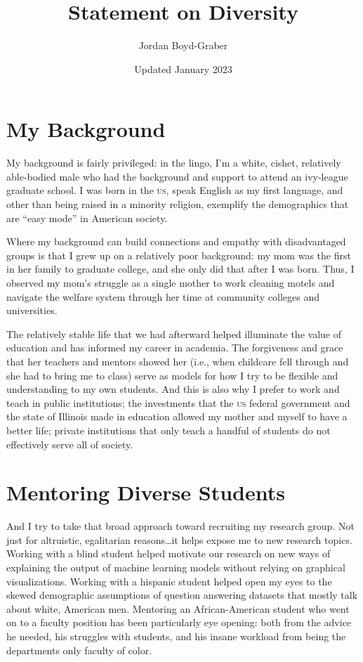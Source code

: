 \documentclass[11pt]{amsart}
\newcommand{\abr}[1]{\textsc{#1}}
\begin{document}
 \title{Statement on Diversity}

 \author{Jordan Boyd-Graber}
\address{University of Maryland}

\date{Updated January 2023}


\keywords{}

\maketitle

\section{My Background}

My background is fairly privileged: in the lingo, I'm a white, cishet,
relatively able-bodied male who had the background and support to attend an ivy-league graduate school.
%
I was born in the \abr{us}, speak English as my first language, and
other than being raised in a minority religion, exemplify the
demographics that are ``easy mode'' in American society.

Where my background can build connections and empathy with
disadvantaged groups is that I grew up on a relatively poor
background: my mom was the first in her family to graduate college,
and she only did that after I was born.
%
Thus, I observed my mom's struggle as a single mother to work cleaning
motels and navigate the welfare system through her time at community colleges and universities.

The relatively stable life that we had afterward helped illuminate the
value of education and has informed my career in academia.
%
The forgiveness and grace that her teachers and mentors showed her
(i.e., when childcare fell through and she had to bring me to class)
serve as models for how I try to be flexible and understanding to my
own students.
%
And this is also why I prefer to work and teach in public
institutions; the investments that the \abr{us} federal government and
the state of Illinois made in education allowed my mother and myself
to have a better life; private institutions that only teach a handful
of students do not effectively serve all of society.

\section{Mentoring Diverse Students}

And I try to take that broad approach toward recruiting my research
group.
%
Not just for altruistic, egalitarian reasons\dots it helps expose me
to new research topics.
%
Working with a blind student helped motivate our research on new ways
of explaining the output of machine learning models without relying on
graphical visualizations.
%
Working with a hispanic student helped open my eyes to the skewed
demographic assumptions of question answering datasets that mostly
talk about white, American men.
%
Mentoring an African-American student who went on to a faculty
position has been particularly eye opening: both from the advice he needed, his struggles with students, and his insane workload from
being the departments only faculty of color.
\end{document}

